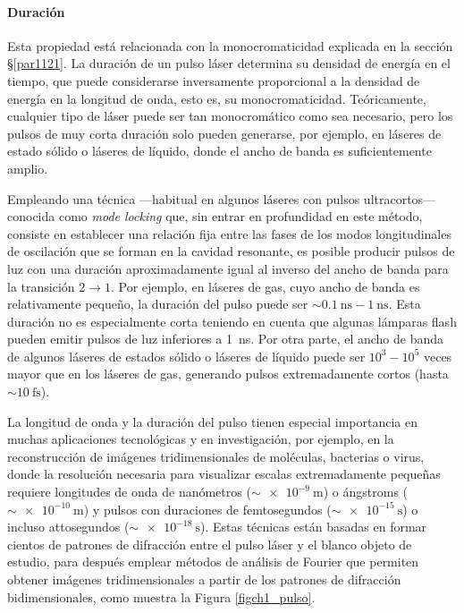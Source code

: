 \paragraph{Duración} \label{par1125}
Esta propiedad está relacionada con la monocromaticidad explicada en la sección \S\ref{par1121}. La duración de un pulso láser determina su densidad de energía en el tiempo, que puede considerarse inversamente proporcional a la densidad de energía en la longitud de onda, esto es, su monocromaticidad\autocite{Svelto2010PrinciplesLasers}. Teóricamente, cualquier tipo de láser puede ser tan monocromático como sea necesario, pero los pulsos de muy corta duración solo pueden generarse, por ejemplo, en láseres de estado sólido o láseres de líquido, donde el ancho de banda es suficientemente amplio.

Empleando una técnica ---habitual en algunos láseres con pulsos ultracortos--- conocida como \emph{mode locking} que, sin entrar en profundidad en este método, consiste en establecer una relación fija entre las fases de los modos longitudinales de oscilación que se forman en la cavidad resonante, es posible producir pulsos de luz con una duración aproximadamente igual al inverso del ancho de banda para la transición $2 \rightarrow 1$. Por ejemplo, en láseres de gas, cuyo ancho de banda es relativamente pequeño, la duración del pulso puede ser $\sim\qty{0,1}{\ns}-\qty{1}{\ns}$. Esta duración no es especialmente corta teniendo en cuenta que algunas lámparas flash pueden emitir pulsos de luz inferiores a \qty{1}{\ns}. Por otra parte, el ancho de banda de algunos láseres de estados sólido o láseres de líquido puede ser $10^3-10^5$ veces mayor que en los láseres de gas, generando pulsos extremadamente cortos (hasta $\sim\qty{10}{\fs}$).

La longitud de onda y la duración del pulso tienen especial importancia en muchas aplicaciones tecnológicas y en investigación, por ejemplo, en la reconstrucción de imágenes tridimensionales de moléculas\autocite{vonArdenne2018StructureImage}, bacterias o virus\autocite{Ekeberg2015Three-DimensionalLaser}, donde la resolución necesaria para visualizar escalas extremadamente pequeñas requiere longitudes de onda de nanómetros ($\sim\qty{e-9}{\m}$) o ángstroms ($\sim\qty{e-10}{\m}$) y pulsos con duraciones de femtosegundos ($\sim\qty{e-15}{\s}$) o incluso attosegundos ($\sim\qty{e-18}{\s}$). Estas técnicas están basadas en formar cientos de patrones de difracción entre el pulso láser y el blanco objeto de estudio, para después emplear métodos de análisis de Fourier que permiten obtener imágenes tridimensionales a partir de los patrones de difracción bidimensionales, como muestra la Figura \ref{figch1_pulso}.

